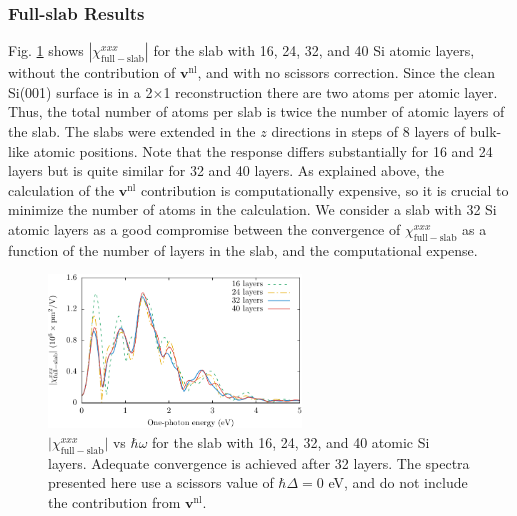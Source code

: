 
\subsubsection{Full-slab Results}\label{sec:fsresults}

Fig. \ref{fig:layersconv} shows $|\chi_{\mathrm{full-slab}}^{xxx}|$ for the slab
with 16, 24, 32, and 40 Si atomic layers, without the contribution of
$\mathbf{v}^{\mathrm{nl}}$, and with no scissors correction. Since the clean
Si(001) surface is in a 2$\times$1 reconstruction there are two atoms per atomic
layer. Thus, the total number of atoms per slab is twice the number of atomic
layers of the slab. The slabs were extended in the $z$ directions in steps of 8
layers of bulk-like atomic positions. Note that the response differs
substantially for 16 and 24 layers but is quite similar for 32 and 40 layers. As
explained above, the calculation of the $\mathbf{v}^\mathrm{nl}$ contribution is
computationally expensive, so it is crucial to minimize the number of atoms in
the calculation. We consider a slab with 32 Si atomic layers as a good compromise
between the convergence of $\chi^{xxx}_{\mathrm{full-slab}}$ as a function of
the number of layers in the slab, and the computational expense.

\begin{figure}[t]
\centering 
\includegraphics[width=0.6\textwidth]{content/figures/fig-Si2x1-layerconv}
\caption[Layer convergence for the Si(001)(2$\times$1) slab.]
{$\vert\chi_{\mathrm{full-slab}}^{xxx}\vert$ vs $\hbar\omega$ for the
slab with 16, 24, 32, and 40 atomic Si layers. Adequate convergence is achieved
after 32 layers. The spectra presented here use a scissors value of $\hbar\Delta
= 0$ eV, and do not include the contribution from $\mathbf{v}^{\mathrm{nl}}$.}
\label{fig:layersconv}
\end{figure}



